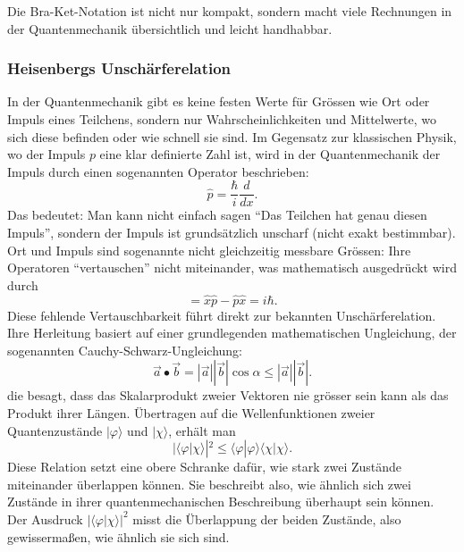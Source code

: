 		Die Bra-Ket-Notation ist nicht nur kompakt, sondern macht viele Rechnungen in der Quantenmechanik übersichtlich und leicht handhabbar.

	\subsubsection{Heisenbergs Unschärferelation%
	\label{fourier:subsubsection:unschaerferelation}}
	In der Quantenmechanik gibt es keine festen Werte für Grössen wie Ort oder Impuls eines Teilchens, sondern nur Wahrscheinlichkeiten und Mittelwerte, wo sich diese befinden oder wie schnell sie sind.
	Im Gegensatz zur klassischen Physik, wo der Impuls $p$ eine klar definierte Zahl ist, wird in der Quantenmechanik der Impuls durch einen sogenannten Operator beschrieben:
	\begin{equation}
		\hat{p} = \frac{\hbar}{i} \frac{d}{dx}.
	\end{equation}
	Das bedeutet:
	Man kann nicht einfach sagen ``Das Teilchen hat genau diesen Impuls'', sondern der Impuls ist grundsätzlich unscharf (nicht exakt bestimmbar).
	Ort und Impuls sind sogenannte nicht gleichzeitig messbare Grössen:
	Ihre Operatoren ``vertauschen'' nicht miteinander, was mathematisch ausgedrückt wird durch
	\begin{equation}
		[\hat{x},\hat{p}] = \hat{x} \hat{p} - \hat{p} \hat{x} = i \hbar.
	\end{equation}
	Diese fehlende Vertauschbarkeit führt direkt zur bekannten Unschärferelation.
	Ihre Herleitung basiert auf einer grundlegenden mathematischen Ungleichung, der sogenannten Cauchy-Schwarz-Ungleichung:
	\begin{equation}
		\vec{a} \bullet \vec{b} = |\vec{a}| |\vec{b}|\cos\alpha \le |\vec{a}| |\vec{b}|.
	\end{equation}
	die besagt, dass das Skalarprodukt zweier Vektoren nie grösser sein kann als das Produkt ihrer Längen.
	Übertragen auf die Wellenfunktionen zweier Quantenzustände $|\varphi\rangle$ und $|\chi\rangle$, erhält man
	\begin{equation}
		|\langle\varphi | \chi\rangle|^2 \le \langle\varphi | \varphi\rangle \langle\chi | \chi\rangle.
	\end{equation}
	Diese Relation setzt eine obere Schranke dafür, wie stark zwei Zustände miteinander überlappen können. Sie beschreibt also, wie ähnlich sich zwei Zustände in ihrer quantenmechanischen Beschreibung überhaupt sein können.
	Der Ausdruck $|\langle\varphi|\chi\rangle|^2$ misst die Überlappung der beiden Zustände, also gewissermaßen, wie ähnlich sie sich sind.
